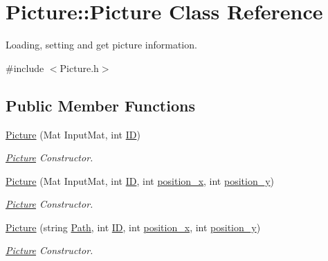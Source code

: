 \hypertarget{class_picture_1_1_picture}{}\section{Picture\+:\+:Picture Class Reference}
\label{class_picture_1_1_picture}


Loading, setting and get picture information.  




{\ttfamily \#include $<$Picture.\+h$>$}

\subsection*{Public Member Functions}
\begin{DoxyCompactItemize}
\item 
\hyperlink{class_picture_1_1_picture_a165669e49c6744c9530e376ccc21bc09}{Picture} (Mat Input\+Mat, int \hyperlink{class_picture_1_1_picture_a96f8b585779e75511229adf4052fcb1c}{ID})
\begin{DoxyCompactList}\small\item\em \hyperlink{class_picture_1_1_picture}{Picture} Constructor. \end{DoxyCompactList}\item 
\hyperlink{class_picture_1_1_picture_aa44b84f379d837a26bd23ba8ef7c59a6}{Picture} (Mat Input\+Mat, int \hyperlink{class_picture_1_1_picture_a96f8b585779e75511229adf4052fcb1c}{ID}, int \hyperlink{group___the_gabc618c40aa01ec5878903a3170e1867a}{position\+\_\+x}, int \hyperlink{group___the_gaad6be8d081af96530b6de3094b979af9}{position\+\_\+y})
\begin{DoxyCompactList}\small\item\em \hyperlink{class_picture_1_1_picture}{Picture} Constructor. \end{DoxyCompactList}\item 
\hyperlink{class_picture_1_1_picture_a4214dbada4ee78f67661b249667cc304}{Picture} (string \hyperlink{class_picture_1_1_picture_aa2a2802fbbad4a814012250c6dd1aa16}{Path}, int \hyperlink{class_picture_1_1_picture_a96f8b585779e75511229adf4052fcb1c}{ID}, int \hyperlink{group___the_gabc618c40aa01ec5878903a3170e1867a}{position\+\_\+x}, int \hyperlink{group___the_gaad6be8d081af96530b6de3094b979af9}{position\+\_\+y})
\begin{DoxyCompactList}\small\item\em \hyperlink{class_picture_1_1_picture}{Picture} Constructor. \end{DoxyCompactList}\item 

\end{DoxyCompactItemize}
